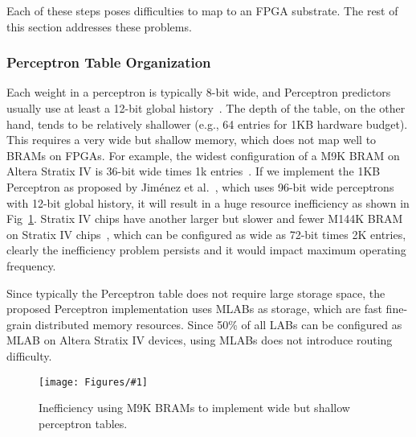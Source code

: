 \documentclass[conference]{IEEEtran}
\newcommand{\kfig}[4]{ %
        \begin{figure}[!t]
        \centering
        \texttt{[image: Figures/\#1]}
        \vspace{-1mm}
        \caption{#3}
        \label{#2}
        \end{figure}
}
\begin{document}
Each of these steps poses difficulties to map to an FPGA substrate. The rest of this section addresses these problems.

\subsubsection{Perceptron Table Organization}
\label{sec:fpga:perceptron:table}
Each weight in a perceptron is typically 8-bit wide, and Perceptron predictors usually use at least a 12-bit global history~\cite{perceptron}. The depth of the table, on the other hand, tends to be relatively shallower (e.g., 64 entries for 1KB hardware budget). This requires a very wide but shallow memory, which does not map well to BRAMs on FPGAs. For example, the widest configuration of a M9K BRAM on Altera Stratix IV is 36-bit wide times 1k entries~\cite{StratixIVM9K}. If we implement the 1KB Perceptron as proposed by Jim\'enez et al.~\cite{perceptron}, which uses 96-bit wide perceptrons with 12-bit global history, it will result in a huge resource inefficiency as shown in Fig~\ref{fig:perceptronTable}. Stratix IV chips have another larger but slower and fewer M144K BRAM on Stratix IV chips~\cite{StratixIVM9K}, which can be configured as wide as 72-bit times 2K entries, clearly the inefficiency problem persists and it would impact maximum operating frequency.

Since typically the Perceptron table does not require large storage space, the proposed Perceptron implementation uses MLABs as storage, which are fast fine-grain distributed memory resources. Since 50\% of all LABs can be configured as MLAB on Altera Stratix IV devices, using MLABs does not introduce routing difficulty.
\kfig{perceptronTable.pdf}{fig:perceptronTable}{Inefficiency using M9K BRAMs to implement wide but shallow perceptron tables.}{angle = 0, trim = 1in 2in 3.4in 0.6in, clip, width=0.25\textwidth}
\end{document}
